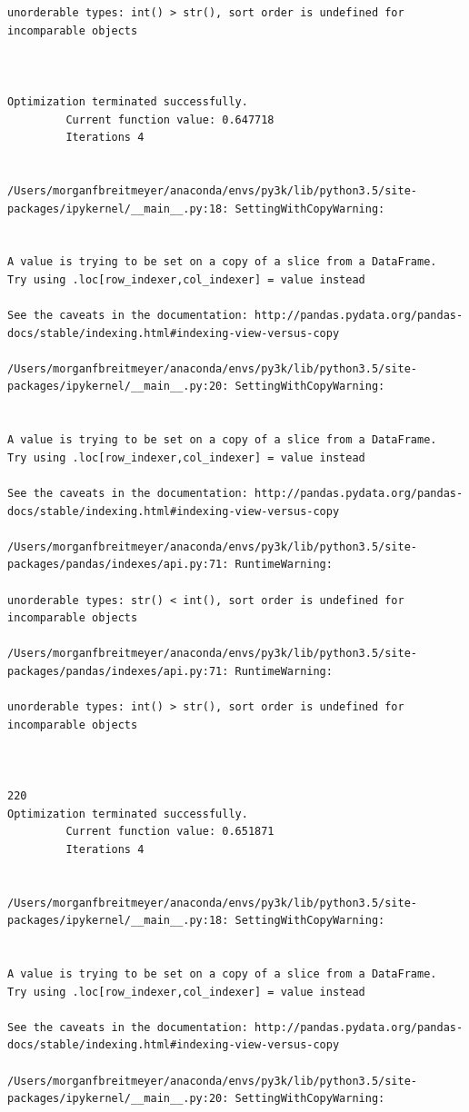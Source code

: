 \begin{lstlisting}
unorderable types: int() > str(), sort order is undefined for incomparable objects



Optimization terminated successfully.
         Current function value: 0.647718
         Iterations 4


/Users/morganfbreitmeyer/anaconda/envs/py3k/lib/python3.5/site-packages/ipykernel/__main__.py:18: SettingWithCopyWarning:


A value is trying to be set on a copy of a slice from a DataFrame.
Try using .loc[row_indexer,col_indexer] = value instead

See the caveats in the documentation: http://pandas.pydata.org/pandas-docs/stable/indexing.html#indexing-view-versus-copy

/Users/morganfbreitmeyer/anaconda/envs/py3k/lib/python3.5/site-packages/ipykernel/__main__.py:20: SettingWithCopyWarning:


A value is trying to be set on a copy of a slice from a DataFrame.
Try using .loc[row_indexer,col_indexer] = value instead

See the caveats in the documentation: http://pandas.pydata.org/pandas-docs/stable/indexing.html#indexing-view-versus-copy

/Users/morganfbreitmeyer/anaconda/envs/py3k/lib/python3.5/site-packages/pandas/indexes/api.py:71: RuntimeWarning:

unorderable types: str() < int(), sort order is undefined for incomparable objects

/Users/morganfbreitmeyer/anaconda/envs/py3k/lib/python3.5/site-packages/pandas/indexes/api.py:71: RuntimeWarning:

unorderable types: int() > str(), sort order is undefined for incomparable objects



220
Optimization terminated successfully.
         Current function value: 0.651871
         Iterations 4


/Users/morganfbreitmeyer/anaconda/envs/py3k/lib/python3.5/site-packages/ipykernel/__main__.py:18: SettingWithCopyWarning:


A value is trying to be set on a copy of a slice from a DataFrame.
Try using .loc[row_indexer,col_indexer] = value instead

See the caveats in the documentation: http://pandas.pydata.org/pandas-docs/stable/indexing.html#indexing-view-versus-copy

/Users/morganfbreitmeyer/anaconda/envs/py3k/lib/python3.5/site-packages/ipykernel/__main__.py:20: SettingWithCopyWarning:



\end{lstlisting}
